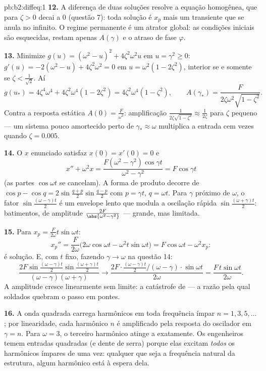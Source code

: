 \begin{solution}{pb:b2:diffeq:1}
\textbf{12.} A diferença de duas soluções resolve a
equação homogênea, que para $\zeta > 0$ decai a $0$
(questão 7): toda solução é $x_p$ mais um transiente
que se anula no infinito. O regime permanente é um atrator global:
as condições iniciais são esquecidas, restam apenas $A(\gamma)$ e o
atraso de fase $\varphi$.

\textbf{13.} Minimize $g(u) = (\omega^2 - u)^2 +
4\zeta^2\omega^2u$ em $u = \gamma^2 \geq 0$: $g'(u) =
-2(\omega^2 - u) + 4\zeta^2\omega^2 = 0$ em $u = \omega^2(1 -
2\zeta^2)$, interior se e somente se $\zeta < \frac{1}{\sqrt2}$. Aí
\[
g(u_*) = 4\zeta^4\omega^4 + 4\zeta^2\omega^4(1 - 2\zeta^2)
= 4\zeta^2\omega^4(1 - \zeta^2),
\qquad
A(\gamma_*) = \frac{F}{2\zeta\omega^2\sqrt{1 - \zeta^2}} .
\]
Contra a resposta estática $A(0) = \frac{F}{\omega^2}$:
amplificação $\frac{1}{2\zeta\sqrt{1-\zeta^2}} \approx
\frac{1}{2\zeta}$ para $\zeta$ pequeno --- um
sistema pouco amortecido perto de $\gamma_* \approx \omega$ multiplica a entrada
cem vezes quando $\zeta = 0.005$.

\textbf{14.} O $x$ enunciado satisfaz $x(0) = x'(0) = 0$ e
\[
x'' + \omega^2 x = \frac{F(\omega^2 -
\gamma^2)\cos\gamma t}{\omega^2 - \gamma^2} = F\cos\gamma t
\]
(as partes $\cos\omega t$ se cancelam). A forma de produto decorre
de $\cos p - \cos q = 2\sin\frac{q+p}{2}\sin\frac{q-p}2$
com $p = \gamma t$, $q = \omega t$. Para $\gamma$ próximo de
$\omega$, o fator $\sin\frac{(\omega-\gamma)t}2$ é um envelope
lento que modula a oscilação rápida
$\sin\frac{(\omega+\gamma)t}2$: batimentos, de amplitude
$\frac{2F}{\abs{\omega^2-\gamma^2}}$ --- grande, mas limitada.

\textbf{15.} Para $x_p = \frac{F}{2\omega}t\sin\omega t$:
\[
x_p'' = \frac{F}{2\omega}\bigl(2\omega\cos\omega t -
\omega^2t\sin\omega t\bigr)
= F\cos\omega t - \omega^2x_p :
\]
é solução. E, com $t$ fixo, fazendo $\gamma \to \omega$ na
questão 14:
\[
\frac{2F\sin\frac{(\omega-\gamma)t}2
\sin\frac{(\omega+\gamma)t}{2}}
{(\omega-\gamma)(\omega+\gamma)}
\longrightarrow
\frac{2F\cdot\frac{(\omega-\gamma)t}2\big/(\omega-\gamma)
\cdot\sin\omega t}{2\omega}
= \frac{F\,t\sin\omega t}{2\omega} .
\]
A amplitude cresce linearmente sem limite: a catástrofe de
 --- a razão pela qual soldados quebram o passo em pontes.

\textbf{16.} A onda quadrada carrega harmônicos em toda frequência
ímpar $n = 1, 3, 5, \dots$; por linearidade, cada harmônico
$n$ é amplificado pela resposta do oscilador em $\gamma = n$.
Para $\omega = 3$, o terceiro harmônico atinge a  exatamente.
Os engenheiros temem entradas quadradas (e dente de serra) porque elas
excitam \emph{todos} os harmônicos ímpares de uma vez: qualquer que seja a frequência
natural da estrutura, algum harmônico está à espera dela.


\end{solution}

